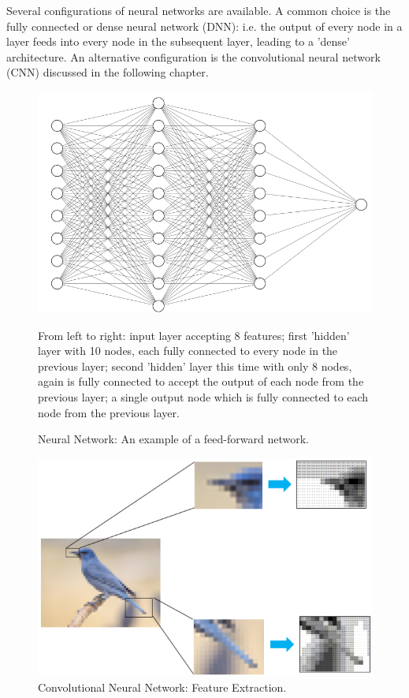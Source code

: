 \noindent
Several configurations of neural networks are available. A common choice is the fully connected or dense neural network (DNN): i.e. the output of every node in a layer feeds into every node in the subsequent layer, leading to a 'dense' architecture. An alternative configuration is the convolutional neural network (CNN) discussed in the following chapter. 

\begin{figure}[p]
	\centering
	\includegraphics[scale=0.6]{Figures/nn.png}
	\caption{Neural Network: An example of a feed-forward network.} {From left to right: input layer accepting 8 features; first 'hidden' layer with 10 nodes, each fully connected to every node in the previous layer; second 'hidden' layer this time with only 8 nodes, again is fully connected to accept the output of each node from the previous layer; a single output node which is fully connected to each node from the previous layer.}
	\label{fig:neural_network}
\end{figure}

\begin{figure}[p]
	\centering
	\includegraphics[scale=0.75]{Figures/cnn_feature.png}
	\caption{Convolutional Neural Network: Feature Extraction.}
	\label{fig:cnn_feature}
\end{figure}

